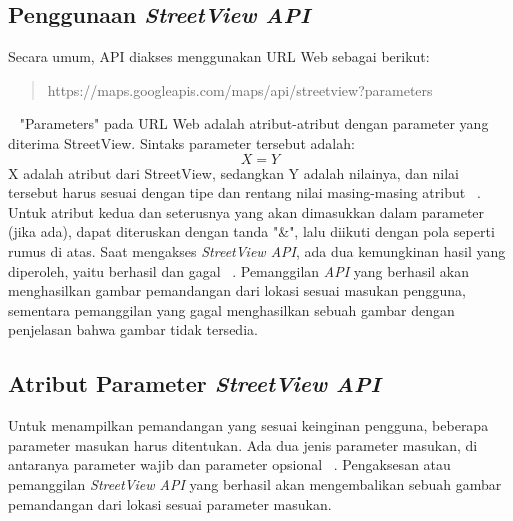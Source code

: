 \subsection{Penggunaan {\it StreetView API}}
\label{subs:streetview-usage}
Secara umum, API diakses menggunakan URL Web sebagai berikut:
\begin{quote}
https://maps.googleapis.com/maps/api/streetview?parameters
\end{quote} ~\cite{streetview-api}
"Parameters" pada URL Web adalah atribut-atribut dengan parameter yang diterima StreetView. Sintaks parameter tersebut adalah: $$ X = Y $$
X adalah atribut dari StreetView, sedangkan Y adalah nilainya, dan nilai tersebut harus sesuai dengan tipe dan rentang nilai masing-masing atribut ~\cite{streetview-api}. Untuk atribut kedua dan seterusnya yang akan dimasukkan dalam parameter (jika ada), dapat diteruskan dengan tanda "\&", lalu diikuti dengan pola seperti rumus di atas. Saat mengakses {\it StreetView API}, ada dua kemungkinan hasil yang diperoleh, yaitu berhasil dan gagal ~\cite{streetview-api}. Pemanggilan \textit{API} yang berhasil akan menghasilkan gambar pemandangan dari lokasi sesuai masukan pengguna, sementara pemanggilan yang gagal menghasilkan sebuah gambar dengan penjelasan bahwa gambar tidak tersedia. 


\subsection{Atribut Parameter {\it StreetView API}}
\label{subs:parameter}
Untuk menampilkan pemandangan yang sesuai keinginan pengguna, beberapa parameter masukan harus ditentukan. Ada dua jenis parameter masukan, di antaranya parameter wajib dan parameter opsional ~\cite{streetview-api}. Pengaksesan atau pemanggilan {\it StreetView API} yang berhasil akan mengembalikan sebuah gambar pemandangan dari lokasi sesuai parameter masukan. 

